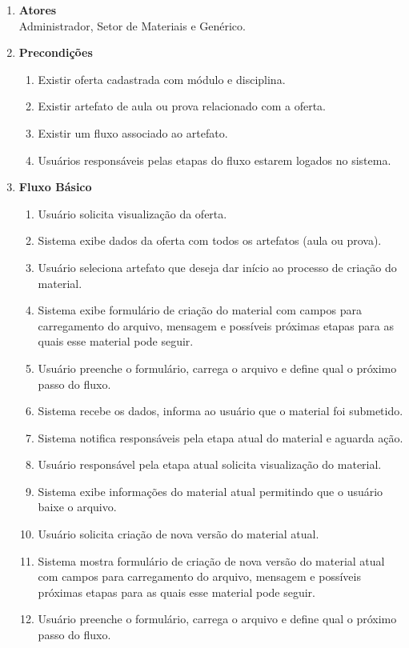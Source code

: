 \begin{enumerate}[label=\textbf{UC\protect\twodigits{\theenumi}}, leftmargin=2cm]
	\begin{enumerate}[label=, leftmargin=0cm]
		\item \textbf{Atores} \\
		Administrador, Setor de Materiais e Genérico.
		\item \textbf{Precondições}
			\begin{enumerate}[label=\arabic*.]
				\item Existir oferta cadastrada com módulo e disciplina.
				\item Existir artefato de aula ou prova relacionado com a oferta.
				\item Existir um fluxo associado ao artefato.
				\item Usuários responsáveis pelas etapas do fluxo estarem logados no sistema.
			\end{enumerate}
		\item \textbf{Fluxo Básico}
			\begin{enumerate}[label=\arabic*.]
				\item Usuário solicita visualização da oferta.
				\item Sistema exibe dados da oferta com todos os artefatos (aula ou prova).
				\item Usuário seleciona artefato que deseja dar início ao processo de criação do material.
				\item Sistema exibe formulário de criação do material com campos para carregamento do arquivo, mensagem e possíveis próximas etapas para as quais esse material pode seguir.
				\item Usuário preenche o formulário, carrega o arquivo e define qual o próximo passo do fluxo.
				\item Sistema recebe os dados, informa ao usuário que o material foi submetido.
				\item Sistema notifica responsáveis pela etapa atual do material e aguarda ação.
				\item Usuário responsável pela etapa atual solicita visualização do material.
				\item Sistema exibe informações do material atual permitindo que o usuário baixe o arquivo.
				\item Usuário solicita criação de nova versão do material atual.
				\item Sistema mostra formulário de criação de nova versão do material atual com campos para carregamento do arquivo, mensagem e possíveis próximas etapas para as quais esse material pode seguir.
				\item Usuário preenche o formulário, carrega o arquivo e define qual o próximo passo do fluxo.

\end{enumerate}
\end{enumerate}
\end{enumerate}
